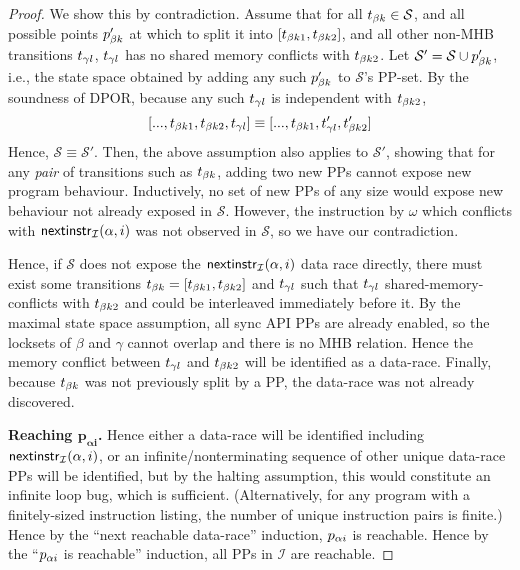 \begin{proof}
We show this by contradiction.
%
Assume that for all $t_{\beta{}k} \in \mathcal{S}$,
and all possible points $p_{\beta{}k}'$ at which to split it into $[t_{\beta{}k1},t_{\beta{}k2}]$,
and all other non-MHB transitions $t_{\gamma{}l}$,
$t_{\gamma{}l}$ has no shared memory conflicts with $t_{\beta{}k2}$.
%
Let $\mathcal{S}' = \mathcal{S} \cup p_{\beta{}k}'$, i.e., the state space obtained by adding any such $p_{\beta{}k}'$ to $\mathcal{S}$'s PP-set.
By the soundness of DPOR, because any such $t_{\gamma{}l}$ is independent with $t_{\beta{}k2}$,
\[
	[..., t_{\beta{}k1}, t_{\beta{}k2}, t_{\gamma{}l}]
	\equiv
	[..., t_{\beta{}k1}, t_{\gamma{}l}', t_{\beta{}k2}']
\]
Hence, $\mathcal{S} \equiv \mathcal{S}'$. %
Then, the above assumption also applies to $\mathcal{S}'$,
showing that for any {\em pair} of transitions such as $t_{\beta{}k}$, adding two new PPs cannot expose new program behaviour.
Inductively, no set of new PPs of any size would expose new behaviour not already exposed in $\mathcal{S}$.
However, the instruction by $\omega$ which conflicts with $\mathsf{nextinstr}_{\mathcal{I}}(\alpha,i)$ was not observed in $\mathcal{S}$,
so we have our contradiction.

Hence, if $\mathcal{S}$ does not expose the $\mathsf{nextinstr}_{\mathcal{I}}(\alpha,i)$ data race directly,
there must exist some transitions $t_{\beta{}k} = [t_{\beta{}k1},t_{\beta{}k2}]$ and $t_{\gamma{}l}$ such that $t_{\gamma{}l}$ shared-memory-conflicts with $t_{\beta{}k2}$ and could be interleaved immediately before it.
By the maximal state space assumption, all sync API PPs are already enabled, so the locksets of $\beta$ and $\gamma$ cannot overlap and there is no MHB relation.
Hence the memory conflict between $t_{\gamma{}l}$ and $t_{\beta{}k2}$ will be identified as a data-race.
Finally, because $t_{\beta{}k}$ was not previously split by a PP, the data-race was not already discovered.

{\bf Reaching $\mathbf{p_{\alpha{}i}}$.}
Hence either a data-race will be identified including $\mathsf{nextinstr}_{\mathcal{I}}(\alpha,i)$,
or an infinite/nonterminating sequence of other unique data-race PPs will be identified,
but by the halting assumption, this would constitute an infinite loop bug, which is sufficient.
(Alternatively, for any program with a finitely-sized instruction listing, the number of unique instruction pairs is finite.)
Hence by the ``next reachable data-race'' induction, $p_{\alpha{}i}$ is reachable.
Hence by the ``$p_{\alpha{}i}$ is reachable'' induction, all PPs in $\mathcal{I}$ are reachable.
\end{proof}


